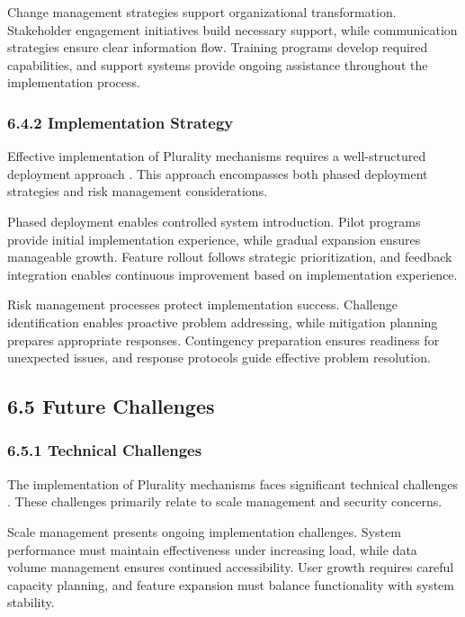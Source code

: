 Change management strategies support organizational transformation. Stakeholder engagement initiatives build necessary support, while communication strategies ensure clear information flow. Training programs develop required capabilities, and support systems provide ongoing assistance throughout the implementation process.

\hypertarget{implementation-strategy-1}{%
\subsubsection{6.4.2 Implementation Strategy}\label{implementation-strategy-1}}

Effective implementation of Plurality mechanisms requires a well-structured deployment approach \citep{vtaiwan2023}. This approach encompasses both phased deployment strategies and risk management considerations.

Phased deployment enables controlled system introduction. Pilot programs provide initial implementation experience, while gradual expansion ensures manageable growth. Feature rollout follows strategic prioritization, and feedback integration enables continuous improvement based on implementation experience.

Risk management processes protect implementation success. Challenge identification enables proactive problem addressing, while mitigation planning prepares appropriate responses. Contingency preparation ensures readiness for unexpected issues, and response protocols guide effective problem resolution.

\hypertarget{future-challenges}{%
\subsection{6.5 Future Challenges}\label{future-challenges}}

\hypertarget{technical-challenges}{%
\subsubsection{6.5.1 Technical Challenges}\label{technical-challenges}}

The implementation of Plurality mechanisms faces significant technical challenges \citep{communitynotes2024}. These challenges primarily relate to scale management and security concerns.

Scale management presents ongoing implementation challenges. System performance must maintain effectiveness under increasing load, while data volume management ensures continued accessibility. User growth requires careful capacity planning, and feature expansion must balance functionality with system stability.

